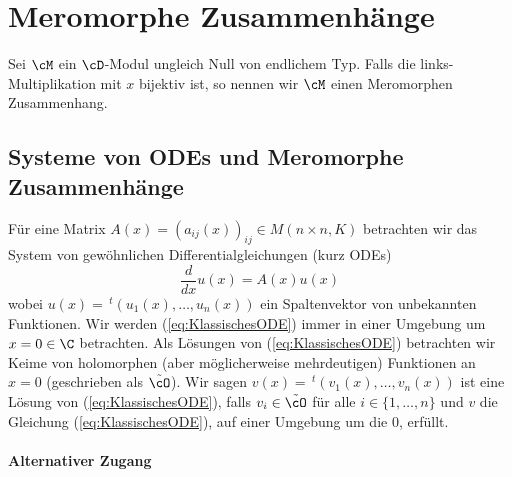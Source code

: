 \chapter{Meromorphe Zusammenhänge}
Sei $\cM$ ein $\cD$-Modul ungleich Null von endlichem Typ. Falls die
links-Multiplikation mit $x$ bijektiv ist, so nennen wir $\cM$ einen
Meromorphen Zusammenhang. \cite[Chap 4]{sabbah_cimpa90}

\section{Systeme von ODEs und Meromorphe Zusammenhänge}
\cite[Chap 5.1.1]{hotta2007d} %
Für eine Matrix $A(x)=(a_{ij}(x))_{ij}\in M(n\times n,K)$ betrachten wir das
System von gewöhnlichen Differentialgleichungen (kurz ODEs)
\begin{equation}
\label{eq:KlassischesODE}
\frac{d}{dx}u(x)=A(x)u(x)
\end{equation}
wobei $u(x)=\,^t(u_1(x),\dots,u_n(x))$ ein Spaltenvektor von unbekannten
Funktionen. Wir werden (\ref{eq:KlassischesODE}) immer in einer Umgebung um
$x=0\in\C$ betrachten. Als Lösungen von (\ref{eq:KlassischesODE}) betrachten
wir Keime von holomorphen (aber möglicherweise mehrdeutigen)
Funktionen an $x=0$ (geschrieben als $\tilde\cO$).
 Wir sagen $v(x)=\,^t(v_1(x),\dots,v_n(x))$ ist
eine Lösung von (\ref{eq:KlassischesODE}), falls $ v_i\in\tilde \cO$ für alle
$i\in\{1,\dots,n\}$ und $v$ die Gleichung (\ref{eq:KlassischesODE}),
auf einer Umgebung um die $0$, erfüllt.

\begin{comment}
TODO: zeige, das der lösungsraum die eigenschaften von $\cD$-Moduln erfüllt\\
siehe alternativer Zugang
\end{comment}

\subsubsection{Alternativer Zugang}
\begin{comment}
Sei $P$ ein linearer Differentialoperator mit Koeffizienten in $a_i(x)\in\Ckx$
geschrieben als $P=\sum^{d}_{i=0}{a_{i}(x)\partial_x^i}$.
Man sagt eine Funktion $u\in\cF$ ist Lösung von $P$, falls $u$ die Gleichung
$Pu=0$ erfüllt.
Man sagt $0$ ist ein singulärer Punkt falls $a_d(0)=0$.
Falls $0$ kein singulärer Punkt ist, hat $P$ genau $d$ über $\C$ Unabhängige
Lösungen in $\Ckx$. %
\end{comment}

